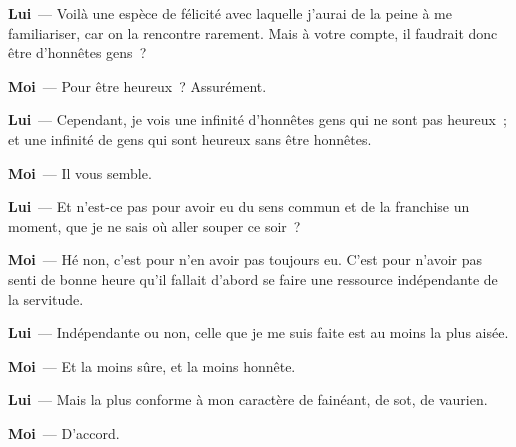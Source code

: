 \documentclass[french,twoside]{book} %
\newcommand{\labelchar}[1]{\textbf{\color{rubric} #1}}
\begin{document}
\labelchar{Lui} — Voilà une espèce de félicité avec laquelle j’aurai de la peine à me familiariser, car on la rencontre rarement. Mais à votre compte, il faudrait donc être d’honnêtes gens ?\par
\labelchar{Moi} — Pour être heureux ? Assurément.\par
\labelchar{Lui} — Cependant, je vois une infinité d’honnêtes gens qui ne sont pas heureux ; et une infinité de gens qui sont heureux sans être honnêtes.\par
\labelchar{Moi} — Il vous semble.\par
\labelchar{Lui} — Et n’est-ce pas pour avoir eu du sens commun et de la franchise un moment, que je ne sais où aller souper ce soir ?\par
\labelchar{Moi} — Hé non, c’est pour n’en avoir pas toujours eu. C’est pour n’avoir pas senti de bonne heure qu’il fallait d’abord se faire une ressource indépendante de la servitude.\par
\labelchar{Lui} — Indépendante ou non, celle que je me suis faite est au moins la plus aisée.\par
\labelchar{Moi} — Et la moins sûre, et la moins honnête.\par
\labelchar{Lui} — Mais la plus conforme à mon caractère de fainéant, de sot, de vaurien.\par
\labelchar{Moi} — D’accord.\par
\end{document}
